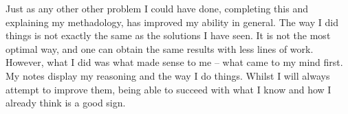 \documentclass[12pt]{article}
\begin{document}
Just as any other other problem I could have done, completing this and explaining my methadology, has improved my ability in general.
The way I did things is not exactly the same as the solutions I have seen.
It is not the most optimal way, and one can obtain the same results with less lines of work.
However, what I did was what made sense to me -- what came to my mind first.
My notes display my reasoning and the way I do things.
Whilst I will always attempt to improve them, being able to succeed with what I know and how I already think is a good sign.
\end{document}

